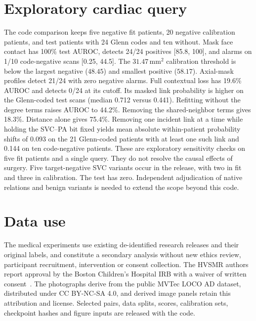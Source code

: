 \section{Exploratory cardiac query}
\label{sec:supp_svc}
The code comparison keeps five negative fit patients, 20 negative calibration patients, and test patients with 24 Glenn codes and ten without. Mask face contact has 100\% test AUROC, detects 24/24 positives [85.8, 100], and alarms on 1/10 code-negative scans [0.25, 44.5]. The $31.47\,\mathrm{mm}^2$ calibration threshold is below the largest negative ($48.45$) and smallest positive ($58.17$). Axial-mask profiles detect 21/24 with zero negative alarms. Full contextual loss has 19.6\% AUROC and detects 0/24 at its cutoff. Its masked link probability is higher on the Glenn-coded test scans (median 0.712 versus 0.441). Refitting without the degree terms raises AUROC to 44.2\%. Removing the shared-neighbor terms gives 18.3\%. Distance alone gives 75.4\%. Removing one incident link at a time while holding the SVC--PA bit fixed yields mean absolute within-patient probability shifts of 0.093 on the 21 Glenn-coded patients with at least one such link and 0.144 on ten code-negative patients. These are exploratory sensitivity checks on five fit patients and a single query. They do not resolve the causal effects of surgery. Five target-negative SVC variants occur in the release, with two in fit and three in calibration. The test has zero. Independent adjudication of native relations and benign variants is needed to extend the scope beyond this code.
\section{Data use}
The medical experiments use existing de-identified research releases and their original labels, and constitute a secondary analysis without new ethics review, participant recruitment, intervention or consent collection. The HVSMR authors report approval by the Boston Children's Hospital IRB with a waiver of written consent~\cite{pace2024}. The photographs derive from the public MVTec LOCO AD dataset, distributed under CC BY-NC-SA 4.0, and derived image panels retain this attribution and license. Selected pairs, data splits, scores, calibration sets, checkpoint hashes and figure inputs are released with the code.
